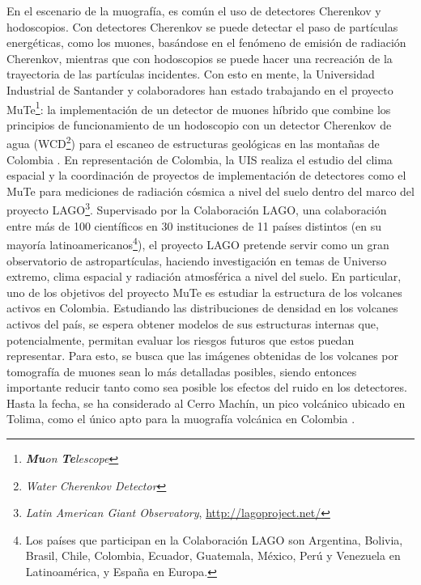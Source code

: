 \documentclass[12pt]{report}
\begin{document}
En el escenario de la muografía, es común el uso de detectores Cherenkov y hodoscopios. Con detectores Cherenkov se puede detectar el paso de partículas energéticas, como los muones, basándose en el fenómeno de emisión de radiación Cherenkov, mientras que con hodoscopios se puede hacer una recreación de la trayectoria de las partículas incidentes. Con esto en mente, la Universidad Industrial de Santander y colaboradores han estado trabajando en el proyecto MuTe\footnote{\textit{\textbf{Mu}on \textbf{Te}lescope}}: la implementación de un detector de muones híbrido que combine los principios de funcionamiento de un hodoscopio con un detector Cherenkov de agua (WCD\footnote{\textit{Water Cherenkov Detector}}) para el escaneo de estructuras geológicas en las montañas de Colombia \cite{pena2019calibration}\cite{rodriguez2018minimute}. En representación de Colombia, la UIS realiza el estudio del clima espacial y la coordinación de proyectos de implementación de detectores como el MuTe para mediciones de radiación cósmica a nivel del suelo dentro del marco del proyecto LAGO\footnote{\textit{Latin American Giant Observatory}, \url{http://lagoproject.net/}}. Supervisado por la Colaboración LAGO, una colaboración entre más de 100 científicos en 30 instituciones de 11 países distintos (en su mayoría latinoamericanos\footnote{Los países que participan en la Colaboración LAGO son Argentina, Bolivia, Brasil, Chile, Colombia, Ecuador, Guatemala, México, Perú y Venezuela en Latinoamérica, y España en Europa.}), el proyecto LAGO pretende servir como un gran observatorio de astropartículas, haciendo investigación en temas de Universo extremo, clima espacial y radiación atmosférica a nivel del suelo. En particular, uno de los objetivos del proyecto MuTe es estudiar la estructura de los volcanes activos en Colombia. Estudiando las distribuciones de densidad en los volcanes activos del país, se espera obtener modelos de sus estructuras internas que, potencialmente, permitan evaluar los riesgos futuros que estos puedan representar. Para esto, se busca que las imágenes obtenidas de los volcanes por tomografía de muones sean lo más detalladas posibles, siendo entonces importante reducir tanto como sea posible los efectos del ruido en los detectores. Hasta la fecha, se ha considerado al Cerro Machín, un pico volcánico ubicado en Tolima, como el único apto para la muografía volcánica en Colombia \cite{vesga2018inversion}\cite{balaguera2017astroparticle}.
\end{document}

